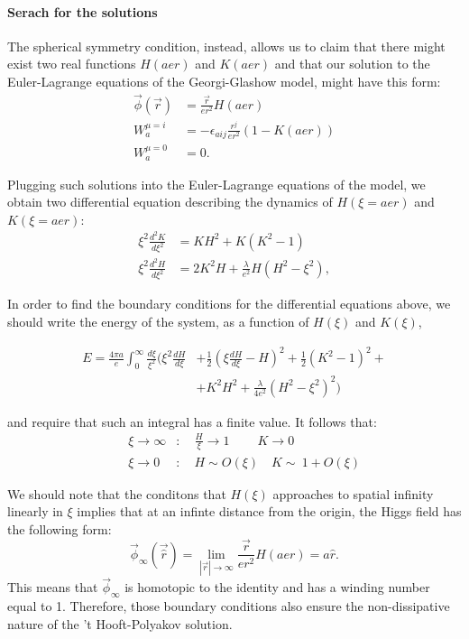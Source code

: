 \documentclass[main.tex]{subfiles}
\begin{document}
   \paragraph{Serach for the solutions}The spherical symmetry condition, instead, allows us to claim that there might exist two real functions $H(aer)$ and $K(aer)$ and that our solution to the Euler-Lagrange equations of the Georgi-Glashow model, might have this form: 
  \begin{align}
      \vec{\phi}(\vec{r}) &= \frac{\vec{r}}{er^2}H(aer) \\ 
      W^{\mu =i}_{a} &= - \epsilon_{aij}\frac{r^j}{er^2}(1 - K(aer)) \\
      W^{\mu=0}_{a}&=0. 
  \end{align}
  
  Plugging such solutions into the Euler-Lagrange equations of the model, we obtain two differential equation describing the dynamics of $H(\xi = aer)$ and $K(\xi = aer)$: 
  \begin{align}
  \xi ^2 \frac{d^2 K}{d \xi^2} &= KH^2 + K(K^2-1)   \label{eq:H}\\
  \xi ^2 \frac{d^2 H}{d \xi^2} &= 2K^2H + \frac{\lambda}{e^2}H (H^2 -\xi^2), \label{eq:K}
  \end{align}
  
  In order to find the boundary conditions for the differential equations above, we should write the energy of the system, as a function of $H(\xi)$ and $K(\xi)$,

  \begin{equation}
  \begin{split}
  E = \frac{4 \pi a}{e} \int_{0}^{\infty} \frac{d \xi}{\xi^2}  \bigr( \xi^2\frac{dH}{d\xi}  &+  \frac{1}{2}\left( \xi \frac{dH}{d\xi} -H \right)^2  +  
  \frac{1}{2} \left( K^2 - 1 \right)^2 +  \\
  & +K^2 H^2 + \frac{\lambda}{4e^2} \left( H^2-\xi^2\right)^2   \bigr)
  \end{split}
  \end{equation}
  
  and require that such an integral has a finite value. It follows that: 
  \begin{align}
 && \xi \to \infty &\colon  \quad \frac{H}{\xi} \to 1 \qquad \ K \to 0     \label{eq:bound1}\\
 && \xi  \to 0      &\colon  \quad H \sim  O(\xi)     \quad K \sim \ 1 + O(\xi)  \label{eq:bound2}
  \end{align}
 
 We should note that the conditons that $H(\xi)$ approaches to spatial infinity linearly in $\xi$ implies that at an infinte distance from the origin, the Higgs field has the following form: 
 \begin{equation}
 \vec{\phi}_{\infty}(\vec{\hat{r}}) = \lim_{|\vec{r}| \to \infty } \frac{\vec{r}}{er^2}H(aer) = a \hat{r}.
 \end{equation}
 This means that $\vec{\phi}_{\infty}$ is homotopic to the identity and has a winding number equal to 1. Therefore, those boundary conditions also ensure the non-dissipative nature of the  't Hooft-Polyakov solution.
 
\end{document}
